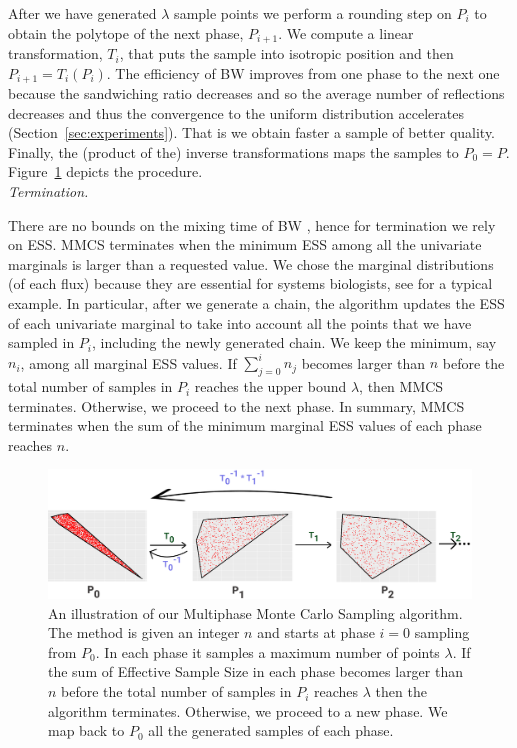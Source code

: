   After we have generated  $\lambda$ sample points we perform
   a rounding step on $P_i$ to obtain the polytope of the next phase, $P_{i+1}$.
   We compute a linear transformation, $T_i$, that puts the sample
   into isotropic position and then $P_{i+1} = T_i(P_i)$.
   The efficiency of BW improves from one phase to the next one
   because the sandwiching ratio decreases and so
   the  average number of reflections decreases
   and thus the convergence  to the uniform distribution accelerates
   (Section~\ref{sec:experiments}).
   That is we obtain faster a sample of better quality.
   Finally, the (product of the) inverse transformations maps the samples to $P_0 = P$. 
   Figure~\ref{fig:mmcs_phases}
   depicts the procedure. \\


   \emph{Termination.} 
   
   There are no bounds on the mixing time of BW \citep{Gryazina14},
   hence for termination we rely on ESS.
   MMCS terminates when the minimum ESS among all the univariate
   marginals is larger than a requested value. We chose the marginal
   distributions (of each flux) because they are essential for systems biologists,
   see \citep{Bordel10} for a typical example.
   In particular, after we generate a chain, the algorithm updates the ESS of each
   univariate marginal to take into account all the points that we have sampled in $P_i$,
   including the newly generated chain. We keep the minimum, say $n_i$, among all
   marginal ESS values. If $\sum_{j=0}^in_j$ becomes larger than $n$ before the
   total number of samples in $P_i$ reaches the upper bound $\lambda$, then  MMCS
   terminates. Otherwise, we proceed to the next phase. In summary, MMCS terminates
   when the sum of the minimum marginal ESS values of each phase reaches $n$. \\


   \begin{figure}[!htbp]
      \includegraphics[width=1.0\columnwidth]{figures/sampling_extra_phase_croped.png}
      \caption[A Multiphase Monte Carlo Sampling algorithm]{
         An illustration of our Multiphase Monte Carlo Sampling algorithm. The method is given an integer $n$ and starts at phase $i=0$ sampling from $P_0$. In each phase it samples a maximum number of points $\lambda$. If the sum of Effective Sample Size in each phase becomes larger than $n$ before the total number of samples in $P_i$ reaches $\lambda$ then the algorithm terminates. Otherwise, we proceed to a  new phase.
    We map back to $P_0$ all the generated samples of each phase.
      }
      \label{fig:mmcs_phases}
   \end{figure}


